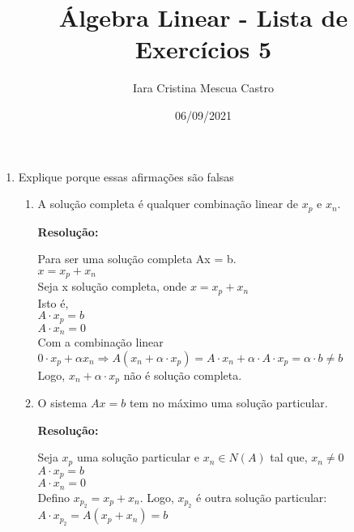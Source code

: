 \documentclass[leqno]{article}
\title{Álgebra Linear - Lista de Exercícios 5}
\author{Iara Cristina Mescua Castro}
\date{06/09/2021}
\numberwithin{equation}{section}
\newenvironment{sol}
{
	\vspace{4mm}
	\noindent\textbf{Resolução:}
	\strut\newline
	\smallskip
	\hspace{-3.5mm}
}
{}
\begin{document}
	
	\maketitle
	
	\begin{enumerate}
		
		\item Explique porque essas afirmações são falsas
		
		\begin{enumerate}
			
			\item A solução completa é qualquer combinação linear de $x_p$ e $x_n$.
			
			\begin{sol} 
				Para ser uma solução completa Ax = b.\\
				\vspace{0.2cm}
				$x = x_p + x_n$\\
				\vspace{0.2cm}
				Seja x solução completa, onde $x = x_p + x_n$\\
				\vspace{0.2cm}
				Isto é,\\
				\vspace{0.2cm}
				$A \cdot x_p = b$\\
				\vspace{0.2cm}
				$A \cdot x_n = 0$\\
				\vspace{0.2cm}
				Com a combinação linear $0 \cdot x_p + \alpha x_n \Rightarrow A (x_n + \alpha \cdot x_p) = A \cdot x_n + \alpha \cdot A \cdot x_p = \alpha \cdot b \neq b$\\
				\vspace{0.2cm}
				Logo, $x_n  + \alpha \cdot x_p$ não é solução completa.
			\end{sol} 
			
			\item O sistema $Ax = b$ tem no máximo uma solução particular.
			
			\begin{sol} 
				Seja $x_p$ uma solução particular e $x_n \in N(A)$ tal que, $x_n \neq 0$\\
				\vspace{0.2cm}
				$A \cdot x_p = b$\\
				\vspace{0.2cm}
				$A \cdot x_n = 0$\\
				\vspace{0.2cm}
				Defino $x_{p_2} = x_p + x_n$. Logo, $x_{p_2}$ é outra solução particular: \\
				\vspace{0.2cm}
				$A \cdot x_{p_2} = A(x_p + x_n) = b$\\
				\vspace{0.2cm}
				

\end{sol}
\end{enumerate}
\end{enumerate}
\end{document}
